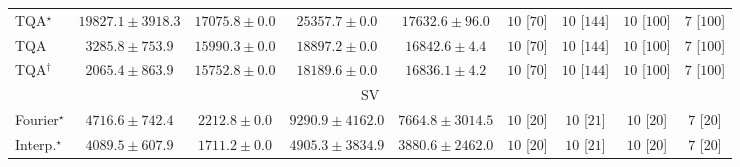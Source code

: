 \begin{tabular}{l|cccc|cccc|}
TQA$^\star$ & {\cellcolor[HTML]{CCEA9D}} \color[HTML]{000000} $19827.1\pm 3918.3$ & {\cellcolor[HTML]{D7EFA2}} \color[HTML]{000000} $17075.8\pm 0.0$ & {\cellcolor[HTML]{B6E192}} \color[HTML]{000000} $25357.7\pm 0.0$ & {\cellcolor[HTML]{D5EEA1}} \color[HTML]{000000} $17632.6\pm 96.0$ & {\cellcolor[HTML]{49006A}} \color[HTML]{F1F1F1} $10$ [$70$] & {\cellcolor[HTML]{49006A}} \color[HTML]{F1F1F1} $10$ [$144$] & {\cellcolor[HTML]{49006A}} \color[HTML]{F1F1F1} $10$ [$100$] & {\cellcolor[HTML]{FFF7F3}} \color[HTML]{000000} $7$ [$100$] \\
TQA & {\cellcolor[HTML]{F9FDC4}} \color[HTML]{000000} $3285.8\pm 753.9$ & {\cellcolor[HTML]{DBF1A4}} \color[HTML]{000000} $15990.3\pm 0.0$ & {\cellcolor[HTML]{D0EC9F}} \color[HTML]{000000} $18897.2\pm 0.0$ & {\cellcolor[HTML]{D9F0A3}} \color[HTML]{000000} $16842.6\pm 4.4$ & {\cellcolor[HTML]{49006A}} \color[HTML]{F1F1F1} $10$ [$70$] & {\cellcolor[HTML]{49006A}} \color[HTML]{F1F1F1} $10$ [$144$] & {\cellcolor[HTML]{49006A}} \color[HTML]{F1F1F1} $10$ [$100$] & {\cellcolor[HTML]{FFF7F3}} \color[HTML]{000000} $7$ [$100$] \\
TQA$^\dagger$ & {\cellcolor[HTML]{FAFDC9}} \color[HTML]{000000} $2065.4\pm 863.9$ & {\cellcolor[HTML]{DCF1A5}} \color[HTML]{000000} $15752.8\pm 0.0$ & {\cellcolor[HTML]{D3EDA0}} \color[HTML]{000000} $18189.6\pm 0.0$ & {\cellcolor[HTML]{D9F0A3}} \color[HTML]{000000} $16836.1\pm 4.2$ & {\cellcolor[HTML]{49006A}} \color[HTML]{F1F1F1} $10$ [$70$] & {\cellcolor[HTML]{49006A}} \color[HTML]{F1F1F1} $10$ [$144$] & {\cellcolor[HTML]{49006A}} \color[HTML]{F1F1F1} $10$ [$100$] & {\cellcolor[HTML]{FFF7F3}} \color[HTML]{000000} $7$ [$100$] \\
\cline{1-9}
\multicolumn{9}{c}{\rule{0pt}{8pt}SV} \\
\midrule
Fourier$^\star$ & {\cellcolor[HTML]{9EBAD9}} \color[HTML]{000000} $4716.6\pm 742.4$ & {\cellcolor[HTML]{F5EFF6}} \color[HTML]{000000} $2212.8\pm 0.0$ & {\cellcolor[HTML]{023858}} \color[HTML]{F1F1F1} $9290.9\pm 4162.0$ & {\cellcolor[HTML]{0569A5}} \color[HTML]{F1F1F1} $7664.8\pm 3014.5$ & {\cellcolor[HTML]{49006A}} \color[HTML]{F1F1F1} $10$ [$20$] & {\cellcolor[HTML]{49006A}} \color[HTML]{F1F1F1} $10$ [$21$] & {\cellcolor[HTML]{49006A}} \color[HTML]{F1F1F1} $10$ [$20$] & {\cellcolor[HTML]{FFF7F3}} \color[HTML]{000000} $7$ [$20$] \\
Interp.$^\star$ & {\cellcolor[HTML]{BBC7E0}} \color[HTML]{000000} $4089.5\pm 607.9$ & {\cellcolor[HTML]{FFF7FB}} \color[HTML]{000000} $1711.2\pm 0.0$ & {\cellcolor[HTML]{94B6D7}} \color[HTML]{000000} $4905.3\pm 3834.9$ & {\cellcolor[HTML]{C4CBE3}} \color[HTML]{000000} $3880.6\pm 2462.0$ & {\cellcolor[HTML]{49006A}} \color[HTML]{F1F1F1} $10$ [$20$] & {\cellcolor[HTML]{49006A}} \color[HTML]{F1F1F1} $10$ [$21$] & {\cellcolor[HTML]{49006A}} \color[HTML]{F1F1F1} $10$ [$20$] & {\cellcolor[HTML]{FFF7F3}} \color[HTML]{000000} $7$ [$20$] \\

\end{tabular}

